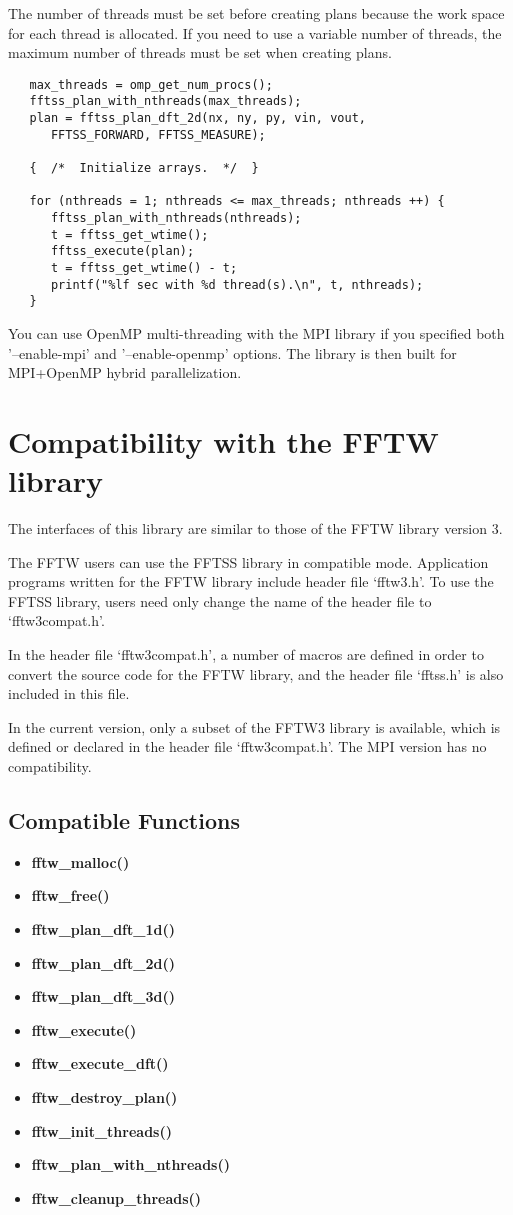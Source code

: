 \documentclass{article}
\begin{document}
The number of threads must be set before creating plans
because the work space for each thread is allocated. If you need to use a variable number of threads, the maximum number of threads must be set when creating plans.

\begin{verbatim}
   max_threads = omp_get_num_procs();
   fftss_plan_with_nthreads(max_threads);
   plan = fftss_plan_dft_2d(nx, ny, py, vin, vout, 
      FFTSS_FORWARD, FFTSS_MEASURE);

   {  /*  Initialize arrays.  */  }

   for (nthreads = 1; nthreads <= max_threads; nthreads ++) {
      fftss_plan_with_nthreads(nthreads);
      t = fftss_get_wtime();
      fftss_execute(plan);
      t = fftss_get_wtime() - t;
      printf("%lf sec with %d thread(s).\n", t, nthreads);
   }
\end{verbatim}

You can use OpenMP multi-threading with the MPI library
if you specified both '--enable-mpi' and '--enable-openmp' options.
The library is then built for MPI+OpenMP hybrid parallelization.

\section{Compatibility with the FFTW library}
The interfaces of this library are similar to those of the FFTW library version 3.

The FFTW users can use the FFTSS library in compatible mode. Application programs written for the FFTW library include header file `fftw3.h'. To use the FFTSS library, users need only change the name of the header file to `fftw3compat.h'.

In the header file `fftw3compat.h', a number of macros are defined in order to convert the source code for the FFTW library, and the header file `fftss.h' is also included in this file. 

In the current version, only a subset of the FFTW3 library is available, which is defined or declared in the header file `fftw3compat.h'. The MPI version has no compatibility.

\subsection{Compatible Functions}
\begin{itemize}
\item{\bf fftw\_malloc()}
\item{\bf fftw\_free()}
\item{\bf fftw\_plan\_dft\_1d()}
\item{\bf fftw\_plan\_dft\_2d()}
\item{\bf fftw\_plan\_dft\_3d()}
\item{\bf fftw\_execute()}
\item{\bf fftw\_execute\_dft()}
\item{\bf fftw\_destroy\_plan()}
\item{\bf fftw\_init\_threads()}
\item{\bf fftw\_plan\_with\_nthreads()}
\item{\bf fftw\_cleanup\_threads()}
\end{itemize}
\end{document}

